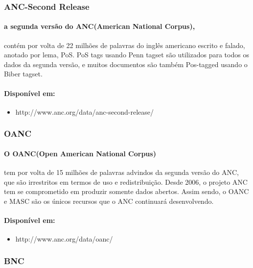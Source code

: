 \documentclass[a4paper, 10pt]{article}
\begin{document}
            \subsubsection{ANC-Second Release}
            	\paragraph{a segunda versão do ANC(American National Corpus),}
            	contém por volta de 22 milhões de palavras do inglês americano escrito e falado, anotado por lema, PoS. PoS tags usando Penn tagset são utilizados para todos os dados da segunda versão, e muitos documentos são também Pos-tagged usando o Biber tagset.
            	
            	\paragraph{Disponível em:}
                \begin{itemize}
                    \item http://www.anc.org/data/anc-second-release/
                \end{itemize}
            \subsubsection{OANC}
            	\paragraph{O OANC(Open American National Corpus)}
            	tem por volta de 15 milhões de palavras advindos da segunda versão do ANC, que são irrestritos em termos de uso e redistribuição. Desde 2006, o projeto ANC tem se comprometido em produzir somente dados abertos. Assim sendo, o OANC e MASC são os únicos recursos que o ANC continuará desenvolvendo.
            	
            	\paragraph{Disponível em:}
                \begin{itemize}
                    \item http://www.anc.org/data/oanc/
                \end{itemize}
            \subsubsection{BNC}
\end{document}
